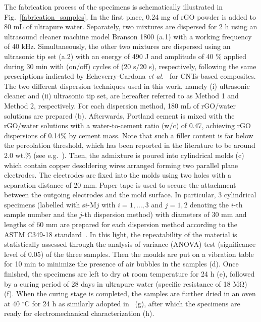 \documentclass[a4paper,fleqn]{cas-sc}
\begin{document}
The fabrication process of the specimens is schematically illustrated in Fig.~\ref{fabrication_samples}. In the first place, 0.24 mg of rGO powder is added to 80 mL of ultrapure water. Separately, two mixtures are dispersed for 2 h using an ultrasound cleaner machine model Branson 1800 (a.1) with a working frequency of 40 kHz. Simultaneously, the other two mixtures are dispersed using an ultrasonic tip set (a.2) with an energy of 490 J and amplitude of 40 \% applied during 30 min with (on/off) cycles of (20 s/20 s), respectively, following the same prescriptions indicated by Echeverry-Cardona \textit{et al.}~\cite{echeverry2021} for CNTs-based composites. The two different dispersion techniques used in this work, namely (i) ultrasonic cleaner and (ii) ultrasonic tip set, are hereafter referred to as Method 1 and Method 2, respectively. For each dispersion method, 180 mL of rGO/water solutions are prepared (b). Afterwards, Portland cement is mixed with the rGO/water solutions with a water-to-cement ratio (w/c) of 0.47, achieving rGO dispersions of 0.14\% by cement mass. Note that such a filler content is far below the percolation threshold, which has been reported in the literature to be around 2.0 wt.\% (see e.g.~\cite{al2016electrical,zhang2020experimental}). Then, the admixture is poured into cylindrical molds (c) which contain copper desoldering wires arranged forming two parallel plane electrodes. The electrodes are fixed into the molds using two holes with a separation distance of 20 mm. Paper tape is used to secure the attachment between the outgoing electrodes and the mold surface. In particular, 3 cylindrical specimens (labelled with s$i$-M$j$ with $i=1,\ldots,3$ and $j=1,2$ denoting the $i$-th sample number and the $j$-th dispersion method) with diameters of 30 mm and lengths of 60 mm are prepared for each dispersion method according to the ASTM C349-18 standard~\cite{astm349}. In this light, the repeatability of the material is statistically assessed through the analysis of variance (ANOVA) test (significance level of 0.05) of the three samples. Then the moulds are put on a vibration table for 10 min to minimize the presence of air bubbles in the samples (d). Once finished, the specimens are left to dry at room temperature for 24 h (e), followed by a curing period of 28 days in ultrapure water (specific resistance of 18 M$\mathrm{\Omega}$) (f). When the curing stage is completed, the samples are further dried in an oven at 40 $^\circ$C for 24 h as similarly adopted in~\cite{echeverry2021} (g), after which the specimens are ready for electromechanical characterization (h). 
\end{document}
